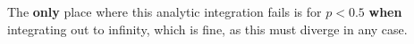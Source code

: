 \documentclass[twocolumn,traditabstract]{aa}
\begin{document}
The \textbf{only} place where this analytic integration fails is for $p < 0.5$ \textbf{when} integrating out to infinity,
which is fine, as this must diverge in any case. 





%

\label{references}
\end{document}

